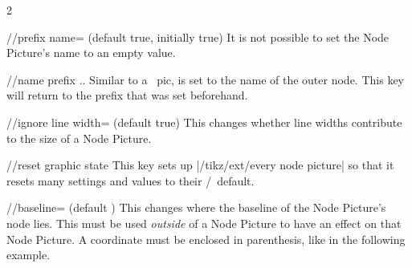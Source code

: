 \begin{multicols*}{2}
\begin{key}{/\tikzextnp/prefix name= (default true, initially true)}
  It is not possible to set the Node Picture's name to an empty value.
  \begin{key}{/\tikzextnp/name prefix ..}
    Similar to a \tikzname\ pic,  is set to the name of the outer node.
    This key will return to the prefix that was set beforehand.
  \end{key}
\end{key}
\begin{key}{/\tikzextnp/ignore line width= (default true)}
  This changes whether line widths contribute to the size of a Node Picture.
\begin{codeexample}[preamble=\usetikzlibrary{ext.nodes}, width=3.5cm]
\end{codeexample}
\begin{codeexample}[preamble=\usetikzlibrary{ext.nodes}, width=3.5cm]
\end{codeexample}
\end{key}
\begin{key}{/\tikzextnp/reset graphic state}
  This key sets up |/tikz/ext/every node picture| so that it resets many settings and values
  to their \pgfname/\tikzname\ default.
\end{key}
\begin{key}{/\tikzextnp/baseline= (default )}
  This changes where the baseline of the Node Picture's node lies.
  This must be used \emph{outside} of a Node Picture to have an effect on that Node Picture.
  A coordinate must be enclosed in parenthesis, like in the following example.
\begin{codeexample}[preamble=\usetikzlibrary{ext.nodes}]
\end{codeexample}
\end{key}
\end{multicols*}
